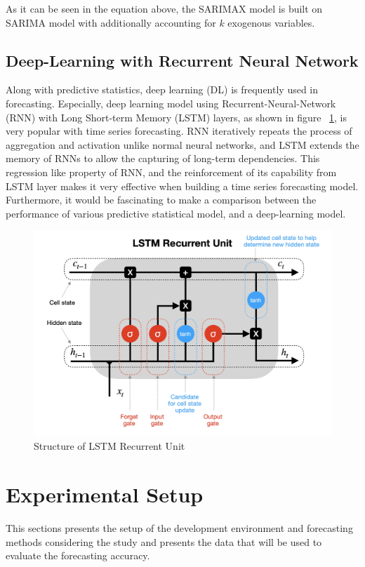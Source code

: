 \documentclass[]{usiinfbachelorproject}
\begin{document}
As it can be seen in the equation above, the SARIMAX model is built on SARIMA model with additionally accounting for ${k}$ exogenous variables. \\

\subsection{Deep-Learning with Recurrent Neural Network}
Along with predictive statistics, deep learning (DL) is frequently used in forecasting. Especially, deep learning model using Recurrent-Neural-Network (RNN) with Long Short-term Memory (LSTM) layers, as shown in figure ~\ref{fig:lstm}, is very popular with time series forecasting. RNN iteratively repeats the process of aggregation and activation unlike normal neural networks, and LSTM extends the memory of RNNs to allow the capturing of long-term dependencies. This regression like property of RNN, and the reinforcement of its capability from LSTM layer makes it very effective when building a time series forecasting model. Furthermore, it would be fascinating to make a comparison between the performance of various predictive statistical model, and a deep-learning model. \\

\begin{figure}[htp]
    \centering
    \includegraphics[width=0.6\linewidth]{figures/lstm.png}
    \caption{Structure of LSTM Recurrent Unit}
    \label{fig:lstm} %
\end{figure}

\section{Experimental Setup}
This sections presents the setup of the development environment and forecasting methods considering the study and presents the data that will be used to evaluate the forecasting accuracy.\\
\end{document}
